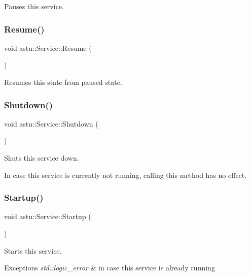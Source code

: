 Pauses this service. \mbox{\label{classastu_1_1Service_a5e90531095fddccdc48648c7ce5ebe70}} 
\subsubsection{\texorpdfstring{Resume()}{Resume()}}
{\footnotesize\ttfamily void astu\+::\+Service\+::\+Resume (\begin{DoxyParamCaption}{ }\end{DoxyParamCaption})}

Resumes this state from paused state. \mbox{\label{classastu_1_1Service_ada193e446024b2ac886ba2954cd5d3b3}} 
\subsubsection{\texorpdfstring{Shutdown()}{Shutdown()}}
{\footnotesize\ttfamily void astu\+::\+Service\+::\+Shutdown (\begin{DoxyParamCaption}{ }\end{DoxyParamCaption})}

Shuts this service down.

In case this service is currently not running, calling this method has no effect. \mbox{\label{classastu_1_1Service_ab52f8c56e0d3081a704e22ae2a8c5c7e}} 
\subsubsection{\texorpdfstring{Startup()}{Startup()}}
{\footnotesize\ttfamily void astu\+::\+Service\+::\+Startup (\begin{DoxyParamCaption}{ }\end{DoxyParamCaption})}

Starts this service.


\begin{DoxyExceptions}{Exceptions}
{\em std\+::logic\+\_\+error} & in case this service is already running \\
\hline
\end{DoxyExceptions}


